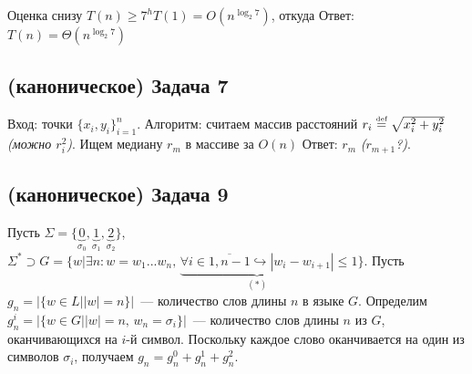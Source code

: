 \documentclass[a4paper]{article}
\def\eqdef{\overset{\mbox{\tiny def}}{=}}
\begin{document}
Оценка снизу $T(n)\geqslant 7^hT(1)=O(n^{\log_2 7})$, откуда\newline
Ответ: $\boxed{T(n)=\Theta(n^{\log_2 7})}$
\subsection*{(каноническое) Задача 7}
Вход: точки $\{x_i,y_i\}_{i=1}^n$.\newline
Алгоритм: считаем массив расстояний $r_i\eqdef \sqrt{x_i^2+y_i^2}$ {\em (можно $r_i^2$)}. Ищем медиану $r_m$ в массиве за $O(n)$\newline
Ответ: $r_{m}$ {\em ($r_{m+1}$?)}.
\subsection*{(каноническое) Задача 9}
Пусть $\Sigma=\{\underbrace{0}_{\sigma_0},\underbrace{1}_{\sigma_1},\underbrace{2}_{\sigma_2}\}$, $\Sigma^*\supset G=\{w\big|\exists n\colon w=w_1...w_n,\,\underbrace{\forall i\in\overline{1,n-1}\hookrightarrow |w_i-w_{i+1}|}_{(*)}\leqslant 1\}$. Пусть $g_n=|\{w\in L\big||w|=n\}|$~--- количество слов длины $n$ в языке $G$. Определим $g^i_n=|\{w\in G\big||w|=n,\,w_n=\sigma_i\}|$~--- количество слов длины $n$ из $G$, оканчивающихся на $i$-й символ. Поскольку каждое слово оканчивается на один из символов $\sigma_i$, получаем $g_n=g_n^0+g_n^1+g_n^2$.
\end{document}

